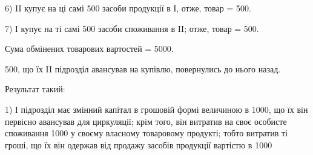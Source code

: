 6) II купує на ці самі 500 засоби продукції в І, отже,
товар = 500.

7) І купує на ті самі 500 засоби споживання в II; отже,
товар = 500.

Сума обмінених товарових вартостей = 5000.

500, що їх II підрозділ авансував на купівлю, повернулись
до нього назад.

Результат такий:

1) І підрозділ має змінний капітал в грошовій формі величиною в 1000, що їх він первісно авансував для циркуляції; крім того, він витратив
на своє особисте споживання 1000 у своєму власному
товаровому продукті; тобто витратив ті гроші, що їх він одержав від продажу
засобів продукції вартістю в 1000
